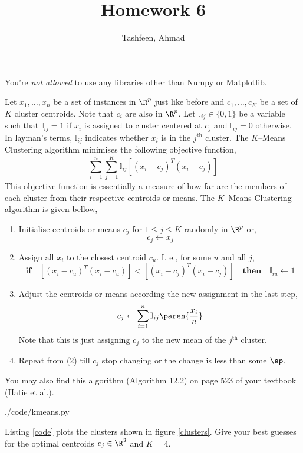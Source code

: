 \documentclass{homework}
\author{Tashfeen, Ahmad}
\title{Homework 6}
\begin{document}
 \maketitle
You're \textit{not allowed} to use any libraries other than Numpy or Matplotlib.

Let $x_{1}, \ldots, x_n$ be a set of instances in $\R^p$ just like before and $c_1, \ldots, c_K$ be a
set of $K$ cluster centroids. Note that $c_i$ are also in $\R^p$. Let $\mathbb{I}_{ij} \in \{0, 1\}$ be a variable such that $\mathbb{I}_{ij} = 1$ if $x_i$ is assigned to cluster centered at $c_j$  and $\mathbb{I}_{ij} = 0$ otherwise. In layman's terms, $\mathbb{I}_{ij}$ indicates whether $x_i$ is in the $j^\text{th}$ cluster. The $K$--Means Clustering algorithm minimises the following objective function,
\[
  \sum_{i=1}^n \sum_{j=1}^K \mathbb{I}_{ij} [(x_i - c_j)^T(x_i - c_j)]
\]
This objective function is essentially a measure of how far are the members of each cluster from their respective centroids or means. The $K$--Means Clustering algorithm is given bellow,

\begin{enumerate}
  \item Initialise centroids or means $c_j$ for $1 \leq j \leq K$ randomly in $\R^p$ or,
        \[
          c_j \leftarrow x_j
        \]
  \item Assign all $x_i$ to the closest centroid $c_u$. I. e., for some $u$ and all $j$,
        \[
          \mathbf{if}\quad [(x_i - c_u)^T(x_i - c_u)]<[(x_i - c_j)^T(x_i - c_j)]\quad \mathbf{then} \quad \mathbb{I}_{iu}\leftarrow 1
        \]
  \item Adjust the centroids or means according the new assignment in the last step,
        \[
          c_j \leftarrow \sum_{i=1}^{n}\mathbb{I}_{ij}\paren{\frac{x_i}{n}}
        \]
        Note that this is just assigning $c_j$ to the new mean of the $j^\text{th}$ cluster.
  \item Repeat from (2) till $c_j$ stop changing or the change is less than some $\ep$.
\end{enumerate}
You may also find this algorithm (Algorithm 12.2) on page 523 of your textbook (Hatie et al.).

{./code/kmeans.py}

\question Listing \ref{code} plots the clusters shown in figure \ref{clusters}. Give your best guesses for the optimal centroids $c_j\in \R^2$ and $K=4$.
\end{document}
